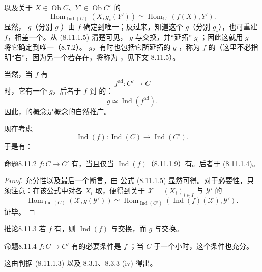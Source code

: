 以及关于 $X\in\operatorname{Ob}C$、$Y'\in\operatorname{Ob}C'$ 的
\[
\operatorname{Hom}_{\operatorname{Ind}(C)}(X,g_\circ(Y'))
\simeq\operatorname{Hom}_{C'}(f(X),Y').\tag{8.11.1.7}
\]
显然， $g$（分别 $g_\circ$）由 $f$ 确定到唯一；反过来，知道这个 $g$（分别 $g_\circ$），也可重建 $f$，相差一个。从 (8.11.1.5) 清楚可见， $g$ 与交换，并“延拓” $g_\circ$；因此这就用 $g_\circ$ 将它确定到唯一（8.7.2）。 $g$，有时也包括它所延拓的 $g_\circ$，称为 $f$ 的（这里不必指明“右”，因为另一个若存在，将称为 ，见下文 8.11.5）。

当然，当 $f$ 有
\[
f^{\mathrm{ad}}:C'\longrightarrow C
\]
时，它有一个  $g$，后者于 $f$ 到 的：
\[
g\simeq\operatorname{Ind}(f^{\mathrm{ad}}).\tag{8.11.1.8}
\]
因此，的概念是概念的自然推广。

现在考虑
\[
\operatorname{Ind}(f):\operatorname{Ind}(C)\longrightarrow\operatorname{Ind}(C').
\tag{8.11.1.9}
\]
于是有：
\begin{SGAresult}{命题}{8.11.2}
 $f:C\to C'$ 有，当且仅当 $\operatorname{Ind}(f)$（8.11.1.9）有。后者于  (8.11.1.4)。
\end{SGAresult}
\begin{proof}
充分性以及最后一个断言，由 公式 (8.11.1.5) 显然可得。对于必要性，只须注意：在该公式中对各 $X_i$ 取，便得到关于  $\mathcal X=(X_i)_{i\in I}$ 与 $\mathcal Y'$ 的
\[
\operatorname{Hom}_{\operatorname{Ind}(C)}(\mathcal X,g(\mathcal Y'))
\simeq\operatorname{Hom}_{\operatorname{Ind}(C')}
(\operatorname{Ind}(f)(\mathcal X),\mathcal Y').\tag{8.11.2.1}
\]
证毕。
\end{proof}
\begin{SGAresult}{推论}{8.11.3}
若 $f$ 有，则 $\operatorname{Ind}(f)$ 与交换，而  $g$ 与交换。
\end{SGAresult}
\begin{SGAresult}{命题}{8.11.4}
 $f:C\to C'$ 有的必要条件是 $f$ ；当 $C$ 于一个小时，这个条件也充分。
\end{SGAresult}
这由判据 (8.11.1.3) 以及 8.3.1、8.3.3 (iv) 得出。

